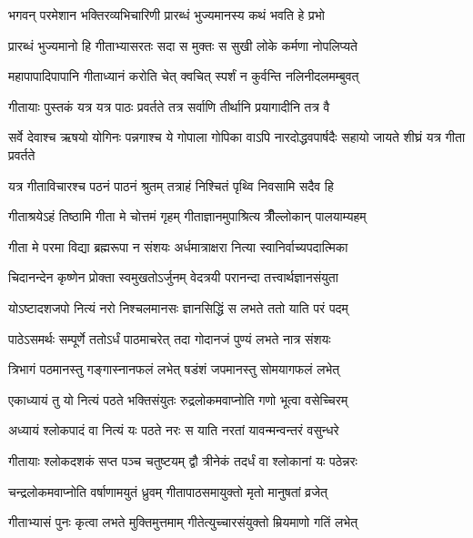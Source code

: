 \twolineshloka
{भगवन् परमेशान भक्तिरव्यभिचारिणी}
{प्रारब्धं भुज्यमानस्य कथं भवति हे प्रभो}%

\twolineshloka
{प्रारब्धं भुज्यमानो हि गीताभ्यासरतः सदा}
{स मुक्तः स सुखी लोके कर्मणा नोपलिप्यते}%

\twolineshloka
{महापापादिपापानि गीताध्यानं करोति चेत्}
{क्वचित् स्पर्शं न कुर्वन्ति नलिनीदलमम्बुवत्}%

\twolineshloka
{गीतायाः पुस्तकं यत्र यत्र पाठः प्रवर्तते}
{तत्र सर्वाणि तीर्थानि प्रयागादीनि तत्र वै}%

\threelineshloka
{सर्वे देवाश्च ऋषयो योगिनः पन्नगाश्च ये}
{गोपाला गोपिका वाऽपि नारदोद्धवपार्षदैः}
{सहायो जायते शीघ्रं यत्र गीता प्रवर्तते}%

\twolineshloka
{यत्र गीताविचारश्च पठनं पाठनं श्रुतम्}
{तत्राहं निश्चितं पृथ्वि निवसामि सदैव हि}%

\twolineshloka
{गीताश्रयेऽहं तिष्ठामि गीता मे चोत्तमं गृहम्}
{गीताज्ञानमुपाश्रित्य त्रीँल्लोकान् पालयाम्यहम्}%

\twolineshloka
{गीता मे परमा विद्या ब्रह्मरूपा न संशयः}
{अर्धमात्राक्षरा नित्या स्वानिर्वाच्यपदात्मिका}%

\twolineshloka
{चिदानन्देन कृष्णेन प्रोक्ता स्वमुखतोऽर्जुनम्}
{वेदत्रयी परानन्दा तत्त्वार्थज्ञानसंयुता}%

\twolineshloka
{योऽष्टादशजपो नित्यं नरो निश्चलमानसः}
{ज्ञानसिद्धिं स लभते ततो याति परं पदम्}%

\twolineshloka
{पाठेऽसमर्थः सम्पूर्णे ततोऽर्धं पाठमाचरेत्}
{तदा गोदानजं पुण्यं लभते नात्र संशयः}%

\twolineshloka
{त्रिभागं पठमानस्तु गङ्गास्नानफलं लभेत्}
{षडंशं जपमानस्तु सोमयागफलं लभेत्}%

\twolineshloka
{एकाध्यायं तु यो नित्यं पठते भक्तिसंयुतः}
{रुद्रलोकमवाप्नोति गणो भूत्वा वसेच्चिरम्}%

\twolineshloka
{अध्यायं श्लोकपादं वा नित्यं यः पठते नरः}
{स याति नरतां यावन्मन्वन्तरं वसुन्धरे}%

\twolineshloka
{गीतायाः श्लोकदशकं सप्त पञ्च चतुष्टयम्}
{द्वौ त्रीनेकं तदर्धं वा श्लोकानां यः पठेन्नरः}%

\twolineshloka
{चन्द्रलोकमवाप्नोति वर्षाणामयुतं ध्रुवम्}
{गीतापाठसमायुक्तो मृतो मानुषतां व्रजेत्}%

\twolineshloka
{गीताभ्यासं पुनः कृत्वा लभते मुक्तिमुत्तमाम्}
{गीतेत्युच्चारसंयुक्तो म्रियमाणो गतिं लभेत्}%

